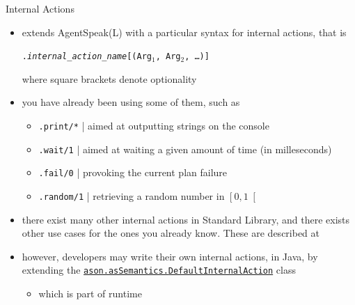 \documentclass[presentation]{beamer}\mode<presentation>{\usetheme{AMSBolognaFC}}
\begin{document}
\begin{frame}[c, allowframebreaks]{\jason{} Internal Actions}
    \begin{itemize}
        \item \jason{} extends AgentSpeak(L) with a particular syntax for \alert{internal actions}, that is
        \begin{center}
            \texttt{\alert{.}\textit{internal\_action\_name}\alert{[}(Arg$_1$, Arg$_2$, \ldots)\alert{]}}
        \end{center}
        where square brackets denote optionality
        
        \vspace{.3cm}
        
        \item you have already been using some of them, such as
        \begin{itemize}
            \item \texttt{\alert{.print}/*} | aimed at outputting strings on the console
            \item \texttt{\alert{.wait}/1} | aimed at waiting a given amount of time (in milleseconds)
            \item \texttt{\alert{.fail}/0} | provoking the current plan failure
            \item \texttt{\alert{.random}/1} | retrieving a random number in $\left[ 0, 1 \right[$
        \end{itemize}
        
        \vspace{.3cm}
        
        \item there exist many other internal actions in \jason{} Standard Library, and there exists other use cases for the ones you already know.
        These are described at
        \begin{center}
        \end{center}
    
        \vspace{.3cm}
        
        \item however, developers may write their own internal actions, in Java, by extending the \href{http://jason.sourceforge.net/api/jason/asSemantics/DefaultInternalAction.html}{\texttt{ason.asSemantics.\alert{DefaultInternalAction}}} class
        \begin{itemize}
            \item which is part of \jason{} runtime
        \end{itemize}
    

\end{itemize}
\end{frame}
\end{document}
